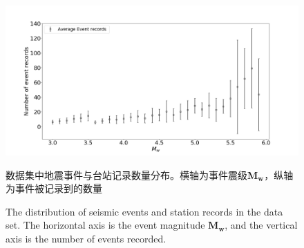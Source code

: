\begin{figure}[!h] 
\centering 
\includegraphics[width=\linewidth]{img/M-N.png} 
\renewcommand{\figurename}{图} 
\caption{数据集中地震事件与台站记录数量分布。横轴为事件震级$\mathbf{M}_{\mathbf{w}}$，纵轴为事件被记录到的数量} 
\addtocounter{figure}{-1} \vspace{-5pt} 
\renewcommand{\figurename}{Fig} 
\caption{The distribution of seismic events and station records in the data set. The horizontal axis is the event magnitude $\mathbf{M}_{\mathbf{w}}$, and the vertical axis is the number of events recorded.} 
\renewcommand{\figurename}{图} 
\label{fig:network-device-influence.png} 
\end{figure}

